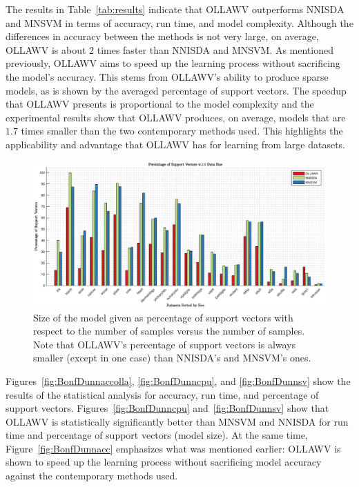 \documentclass[reqno]{vcuthesis}
\numberwithin{equation}{chapter}
\begin{document}
The results in Table~\ref{tab:results} indicate that OLLAWV outperforms NNISDA and MNSVM in terms of accuracy, run time, and model complexity. Although the differences in accuracy between the methods is not very large, on average, OLLAWV is about $2$ times faster than NNISDA and MNSVM. As mentioned previously, OLLAWV aims to speed up the learning process without sacrificing the model's accuracy. This stems from OLLAWV's ability to produce sparse models, as is shown by the averaged percentage of support vectors. The speedup that OLLAWV presents is proportional to the model complexity and the experimental results show that OLLAWV produces, on average, models that are $1.7$ times smaller than the two contemporary methods used. This highlights the applicability and advantage that OLLAWV has for learning from large datasets. 

\begin{figure}[t!]
\centering
\includegraphics[trim={3.2cm 0 3.2cm 0},clip,width=\textwidth]{figures/PSV_vs_NumData.eps}
\caption{\small Size of the model given as percentage of support vectors with respect to the number of samples  versus the number of samples. Note that OLLAWV’s percentage of support vectors is always smaller (except in one case) than NNISDA's and MNSVM's ones.}
\label{fig:psvvssamples}
\end{figure}

\newpage
Figures~\ref{fig:BonfDunnaccolla}, \ref{fig:BonfDunncpu}, and \ref{fig:BonfDunnsv} show the results of the statistical analysis for accuracy, run time, and percentage of support vectors. Figures~\ref{fig:BonfDunncpu} and~\ref{fig:BonfDunnsv} show that OLLAWV is statistically significantly better than MNSVM and NNISDA for run time and percentage of support vectors (model size). At the same time, Figure~\ref{fig:BonfDunnacc} emphasizes what was mentioned earlier: OLLAWV is shown to speed up the learning process without sacrificing model accuracy against the contemporary methods used. 
\end{document}
